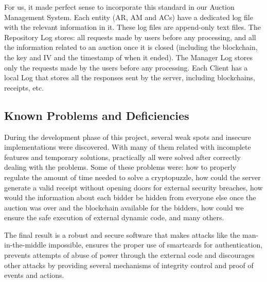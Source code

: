 \documentclass[a4paper]{article}
\begin{document}
For us, it made perfect sense to incorporate this standard in our Auction Management System.
Each entity (AR, AM and ACs) have a dedicated log file with the relevant information in it.
These log files are append-only text files.
The Repository Log stores: all requests made by users before any processing, and all the information related to an auction once it is closed (including the blockchain, the key and IV and the timestamp of when it ended).
The Manager Log stores only the requests made by the users before any processing.
Each Client has a local Log that stores all the responses sent by the server, including blockchains, receipts, etc.

\subsection{Known Problems and Deficiencies}
\label{subsec:knownproblemsanddeficiencies}

During the development phase of this project, several weak spots and insecure implementations were discovered.
With many of them related with incomplete features and temporary solutions, practically all were solved after correctly dealing with the problems.
Some of these problems were: how to properly regulate the amount of time needed to solve a cryptopuzzle, how could the server generate a valid receipt without opening doors for external security breaches, how would the information about each bidder be hidden from everyone else once the auction was over and the blockchain available for the bidders, how could we ensure the safe execution of external dynamic code, and many others.

The final result is a robust and secure software that makes attacks like the man-in-the-middle impossible, ensures the proper use of smartcards for authentication, prevents attempts of abuse of power through the external code and discourages other attacks by providing several mechanisms of integrity control and proof of events and actions.
\end{document}
